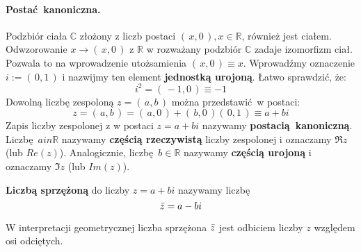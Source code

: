 \paragraph{Postać kanoniczna.} Podzbiór ciała $\mathds{C}$ złożony z liczb postaci $(\,x,0\,), x \in \mathds{R}$, również jest ciałem. Odwzorowanie $x \rightarrow (\,x,0\,)$ z $\mathds{R}$ w rozważany podzbiór $\mathds{C}$ zadaje izomorfizm ciał. Pozwala to na wprowadzenie utożsamienia $(\,x,0\,) \equiv x$. Wprowadźmy oznaczenie $i := (\,0,1\,)$ i nazwijmy ten element \textbf{jednostką urojoną}. Łatwo sprawdzić, że:
\begin{equation*}
    i^2 = (\,-1,0\,) \equiv -1
\end{equation*}
Dowolną liczbę zespoloną $z = (\,a,b\,)$ można przedstawić w postaci:
\begin{equation*}
    z = (\,a,b\,) = (\,a,0\,) + (\,b,0\,)(\,0,1\,) \equiv a+bi
\end{equation*}
Zapis liczby zespolonej z w postaci $z = a+bi$ nazywamy \textbf{postacią kanoniczną}. Liczbę $a in \mathds{R}$ nazywamy \textbf{częścią rzeczywistą} liczby zespolonej i oznaczamy $\Re{z}$ (lub $Re(z)$). Analogicznie, liczbę $b \in \mathds{R}$ nazywamy \textbf{częścią urojoną} i oznaczamy $\Im{z}$ (lub $Im(z)$).
\begin{definition}
    \textbf{Liczbą sprzężoną} do liczby $z = a+bi$ nazywamy liczbę
    \begin{equation*}
        \bar{z} = a-bi
    \end{equation*}
\end{definition}
\begin{center}
\end{center}
W interpretacji geometrycznej liczba sprzężona $\bar{z}$ jest odbiciem liczby $z$ względem osi odciętych.
